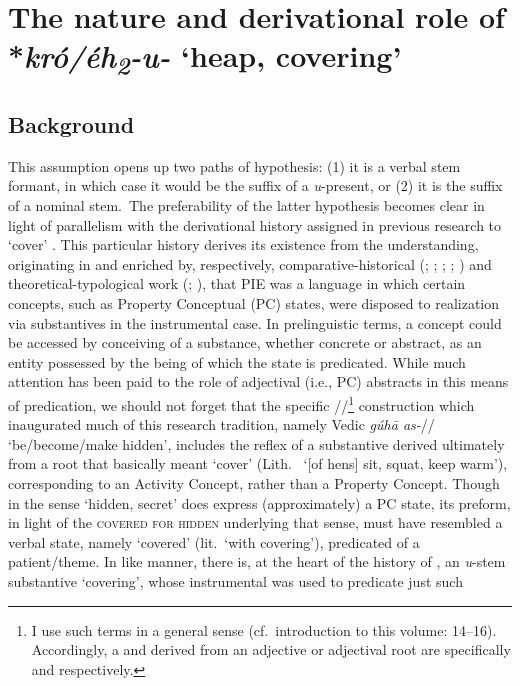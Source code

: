 \documentclass[output=paper,colorlinks,citecolor=brown]{langscibook}
\begin{document}
\section{The nature and derivational role of *\textit{kró/éh\textsubscript{2}-u-} ‘heap, covering’}

\subsection{Background}

This assumption opens up two paths of hypothesis: (1) it is a verbal stem formant, in which case it would be the suffix of a \textit{u}-present, or (2) it is the suffix of a nominal stem.\ The preferability of the latter hypothesis becomes clear in light of parallelism with the derivational history assigned in previous research to  ‘cover’ \citep{Merritt2021}. This particular history derives its existence from the understanding, originating in and enriched by, respectively, comparative-historical (\citealt[118--126]{Jasanoff1978}; \citeyear{Jasanoff2004}; \citealt{Schindler1980}; \citealt{Balles2006}; \citealt{Rau2009}) and theoretical-typological work (\citealt{Dixon1982,Dixon2004}; \citealt{FrancezKoontz2015}), that PIE was a language in which certain  concepts, such as Property Conceptual (PC) states, were disposed to realization via substantives in the instrumental case. In prelinguistic terms, a  concept could be accessed by conceiving of a substance, whether concrete or abstract, as an entity possessed by the being of which the state is predicated. While much attention has been paid to the role of adjectival (i.e., PC) abstracts in this means of  predication, we should not forget that the specific //\footnote{I use such terms in a general sense (cf.\ introduction to this volume: 14--16). Accordingly, a  and  derived from an adjective or adjectival root are specifically  and  respectively.} construction which inaugurated much of this research tradition, namely Vedic \textit{gúhā as-}/\mbox{/}  ‘be/become/make hidden’, includes the reflex of a substantive derived ultimately from a root that basically meant ‘cover’ (Lith.\  ‘[of hens] sit, squat, keep warm’), corresponding to an Activity  Concept, rather than a Property Concept. Though  in the sense ‘hidden, secret’ does express (approximately) a PC state, its preform, in light of the  \textsc{covered for hidden} underlying that sense, must have resembled a verbal  state, namely ‘covered’ (lit.\ ‘with covering’), predicated of a patient/theme. In like manner, there is, at the heart of the history of , an  \textit{u}-stem substantive  ‘covering’, whose instrumental was used to predicate just such 
\end{document}
